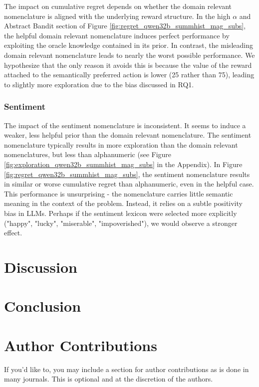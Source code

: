 \documentclass{article} %
\begin{document}
The impact on cumulative regret depends on whether the domain relevant nomenclature is aligned with the underlying reward structure. In the high $\alpha$ and Abstract Bandit section of Figure \ref{fig:regret_qwen32b_summhist_mag_subs}, the helpful domain relevant nomenclature induces perfect performance by exploiting the oracle knowledge contained in its prior. In contrast, the misleading domain relevant nomenclature leads to nearly the worst possible performance. We hypothesize that the only reason it avoids this is because the value of the reward attached to the semantically preferred action is lower (25 rather than 75), leading to slightly more exploration due to the bias discussed in RQ1. 

\subsubsection*{Sentiment}
The impact of the sentiment nomenclature is inconsistent. It seems to induce a weaker, less helpful prior than the domain relevant nomenclature. The sentiment nomenclature typically results in more exploration than the domain relevant nomenclatures, but less than alphanumeric (see Figure \ref{fig:exploration_qwen32b_summhist_mag_subs} in the Appendix). In Figure \ref{fig:regret_qwen32b_summhist_mag_subs}, the sentiment nomenclature results in similar or worse cumulative regret than alphanumeric, even in the helpful case. This performance is unsurprising - the nomenclature carries little semantic meaning in the context of the problem. Instead, it relies on a subtle positivity bias in LLMs. Perhaps if the sentiment lexicon were selected more explicitly ("happy", "lucky", "miserable", "impoverished"), we would observe a stronger effect.

\section{Discussion}



\section{Conclusion}




\section*{Author Contributions}
If you'd like to, you may include  a section for author contributions as is done
in many journals. This is optional and at the discretion of the authors.
\end{document}
